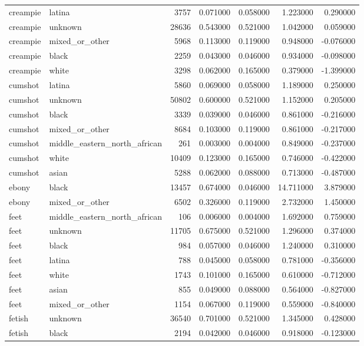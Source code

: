 \begin{tabular}{llrrrrr}
creampie & latina & 3757 & 0.071000 & 0.058000 & 1.223000 & 0.290000 \\
creampie & unknown & 28636 & 0.543000 & 0.521000 & 1.042000 & 0.059000 \\
creampie & mixed_or_other & 5968 & 0.113000 & 0.119000 & 0.948000 & -0.076000 \\
creampie & black & 2259 & 0.043000 & 0.046000 & 0.934000 & -0.098000 \\
creampie & white & 3298 & 0.062000 & 0.165000 & 0.379000 & -1.399000 \\
cumshot & latina & 5860 & 0.069000 & 0.058000 & 1.189000 & 0.250000 \\
cumshot & unknown & 50802 & 0.600000 & 0.521000 & 1.152000 & 0.205000 \\
cumshot & black & 3339 & 0.039000 & 0.046000 & 0.861000 & -0.216000 \\
cumshot & mixed_or_other & 8684 & 0.103000 & 0.119000 & 0.861000 & -0.217000 \\
cumshot & middle_eastern_north_african & 261 & 0.003000 & 0.004000 & 0.849000 & -0.237000 \\
cumshot & white & 10409 & 0.123000 & 0.165000 & 0.746000 & -0.422000 \\
cumshot & asian & 5288 & 0.062000 & 0.088000 & 0.713000 & -0.487000 \\
ebony & black & 13457 & 0.674000 & 0.046000 & 14.711000 & 3.879000 \\
ebony & mixed_or_other & 6502 & 0.326000 & 0.119000 & 2.732000 & 1.450000 \\
feet & middle_eastern_north_african & 106 & 0.006000 & 0.004000 & 1.692000 & 0.759000 \\
feet & unknown & 11705 & 0.675000 & 0.521000 & 1.296000 & 0.374000 \\
feet & black & 984 & 0.057000 & 0.046000 & 1.240000 & 0.310000 \\
feet & latina & 788 & 0.045000 & 0.058000 & 0.781000 & -0.356000 \\
feet & white & 1743 & 0.101000 & 0.165000 & 0.610000 & -0.712000 \\
feet & asian & 855 & 0.049000 & 0.088000 & 0.564000 & -0.827000 \\
feet & mixed_or_other & 1154 & 0.067000 & 0.119000 & 0.559000 & -0.840000 \\
fetish & unknown & 36540 & 0.701000 & 0.521000 & 1.345000 & 0.428000 \\
fetish & black & 2194 & 0.042000 & 0.046000 & 0.918000 & -0.123000 \\

\end{tabular}
